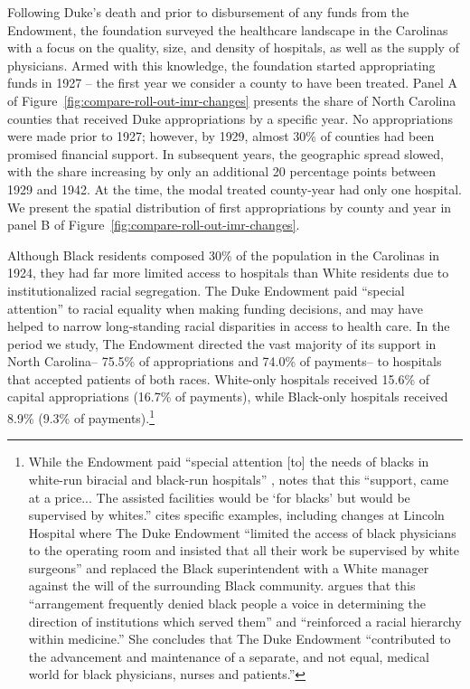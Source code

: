 \documentclass[12pt]{article}
\begin{document}
Following Duke's death and prior to disbursement of any funds from the Endowment, the foundation surveyed the healthcare landscape in the Carolinas with a focus on the quality, size, and density of hospitals, as well as the supply of physicians.
Armed with this knowledge, the foundation started appropriating funds in 1927 -- the first year we consider a county to have been treated.
Panel A of Figure~\ref{fig:compare-roll-out-imr-changes} presents the share of North Carolina counties that received Duke appropriations by a specific year.
No appropriations were made prior to 1927; however, by 1929, almost 30\% of counties had been promised financial support.
In subsequent years, the geographic spread slowed, with the share increasing by only an additional 20 percentage points between 1929 and 1942. 
At the time, the modal treated county-year had only one hospital. 
We present the spatial distribution of first appropriations by county and year in panel B of Figure~\ref{fig:compare-roll-out-imr-changes}.

Although Black residents composed 30\% of the population in the Carolinas in 1924, they had far more limited access to hospitals than White residents due to institutionalized racial segregation.
The Duke Endowment paid ``special attention'' to racial equality when making funding decisions, and may have helped to narrow long-standing racial disparities in access to health care. In the period we study, The Endowment directed the vast majority of its support in North Carolina-- 75.5\% of appropriations and 74.0\% of payments-- to hospitals that accepted patients of both races. White-only hospitals received 15.6\% of capital appropriations (16.7\% of payments), while Black-only hospitals received 8.9\% (9.3\% of payments).\footnote{While the Endowment paid ``special attention [to] the needs of blacks in white-run biracial and black-run hospitals'' ,  notes that this ``support, came at a price... The assisted facilities would be `for blacks' but would be supervised by whites.''
 cites specific examples, including changes at Lincoln Hospital where The Duke Endowment ``limited the access of black physicians to the operating room and insisted that all their work be supervised by white surgeons'' and replaced the Black superintendent with a White manager against the will of the surrounding Black community.
 argues that this ``arrangement frequently denied black people a voice in determining the direction of institutions which served them'' and  ``reinforced a racial hierarchy within medicine.'' She concludes that The Duke Endowment ``contributed to the advancement and maintenance of a separate, and not equal, medical world for black physicians, nurses and patients.''}
\end{document}
